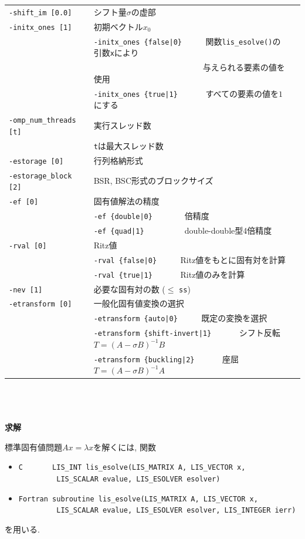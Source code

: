 \documentclass[a4paper]{jarticle}
\begin{document}
{{\begin{minipage}[t]{\textwidth}
\begin{center}
\begin{tabular}{l|ll}
\verb=-shift_im [0.0]= & シフト量$\sigma$の虚部 \\
\verb=-initx_ones [1]= & 初期ベクトル$x_{0}$  \\
                       & \verb=-initx_ones {false|0}     =  関数\verb=lis_esolve()=の引数\verb=x=により \\
                       & \verb=                          =  与えられる要素の値を使用 \\
                       & \verb=-initx_ones {true|1}      =  すべての要素の値を$1$にする\\
\verb=-omp_num_threads [t]= & 実行スレッド数         \\ 
                            & \verb=t=は最大スレッド数 \\
\verb=-estorage [0]=   & 行列格納形式 \\
\verb=-estorage_block [2]= & BSR, BSC形式のブロックサイズ \\ 
\verb=-ef [0]=         & 固有値解法の精度 \\
                       & \verb=-ef {double|0}       =   倍精度 \\
                       & \verb=-ef {quad|1}         =   double-double型4倍精度 \\
\verb=-rval [0]=       & Ritz値 \\
                       & \verb=-rval {false|0}     =  Ritz値をもとに固有対を計算 \\
                       & \verb=-rval {true|1}      =  Ritz値のみを計算 \\
\verb=-nev [1]=        & 必要な固有対の数 ($\le$ \verb=ss=) \\
\verb=-etransform [0]=       & 一般化固有値変換の選択\\
                       & \verb=-etransform {auto|0}     =  既定の変換を選択 \\
                       & \verb=-etransform {shift-invert|1}      =  シフト反転 $T = (A - \sigma B)^{-1}B$ \\
                       & \verb=-etransform {buckling|2}      =  座屈 $T = (A - \sigma B)^{-1}A$ \\
\hline         
\end{tabular}
\end{center}
\end{minipage}
\\ \\ \\
\noindent
{\bf 求解}

標準固有値問題$Ax=\lambda x$を解くには, 関数
\begin{itemize}
\item \verb|C       LIS_INT lis_esolve(LIS_MATRIX A, LIS_VECTOR x,|\\
      \verb|         LIS_SCALAR evalue, LIS_ESOLVER esolver)|
\item \verb|Fortran subroutine lis_esolve(LIS_MATRIX A, LIS_VECTOR x,|\\
      \verb|         LIS_SCALAR evalue, LIS_ESOLVER esolver, LIS_INTEGER ierr)|
\end{itemize}
を用いる. 

}}
\end{document}
